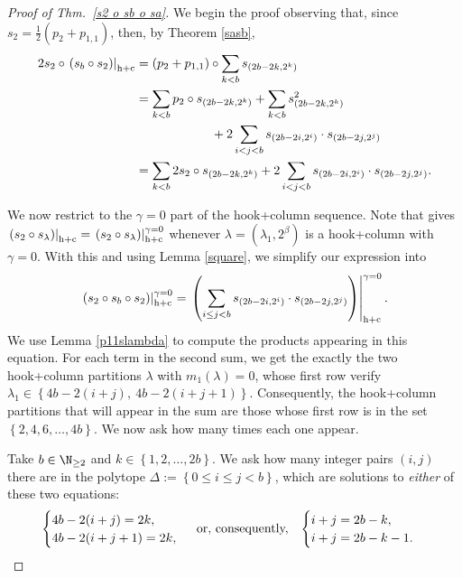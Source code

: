 \documentclass[twoside]{article}
\renewcommand{\hc}[1]{\left.\left(#1\right)\right|_{\textnormal{h+c}}}
\renewcommand{\hcZ}[1]{\left.\left(#1\right)\right|_{\textnormal{h+c}}^{\gamma=0}}
\begin{document}
\begin{proof}[Proof of Thm.~\ref{s2 o sb o sa}]
We begin the proof observing that, since $s_2 = \frac{1}{2}(p_{2}+ p_{1,1})$, then, by Theorem \ref{sasb},
\begin{align}\label{eq:suma gorda}
    2s_2 \circ \hc{s_b\circ s_2}
    &= (p_2 + p_{1,1})\circ \sum_{k<b} s_{(2b-2k, 2^k)}\nonumber\\
    &= \sum_{k<b} p_2\circ s_{(2b-2k, 2^k)} + \sum_{k<b} s_{(2b-2k, 2^k)}^2 \nonumber\\
    &\qquad\qquad\qquad 
    + 2 \sum_{i<j<b} s_{(2b-2i, 2^i)}\cdot s_{(2b-2j, 2^j)}\nonumber\\
    &= \sum_{k<b} 2s_2\circ s_{(2b-2k, 2^k)} + 2 \sum_{i<j<b} s_{(2b-2i, 2^i)}\cdot s_{(2b-2j, 2^j)}.
\end{align}

We now restrict to the $\gamma=0$ part of the hook+column sequence.
Note that \cite[Thm.~4.8 (3)]{langley} gives $\hc{s_2\circ s_\lambda} = \hcZ{s_2\circ s_\lambda}$ whenever $\lambda = (\lambda_1, 2^\beta)$ is a hook+column with $\gamma=0$. With this and using Lemma \ref{square}, we simplify our expression into
\[
\hcZ{s_2\circ s_b \circ s_2} = \hcZ{\sum_{i\le j<b} s_{(2b-2i, 2^i)}\cdot s_{(2b-2j, 2^j)}}.
\]
We use Lemma \ref{p11slambda} to compute the products appearing in this equation. For each term in the second sum, we get the exactly the two hook+column partitions $\lambda$ with $m_1(\lambda)=0$,  whose first row verify
\begin{math}
\lambda_1 \in \left\{4b -2(i+j),\ 4b - 2(i+j+1)\right\}.
\end{math}
Consequently, the hook+column partitions that will appear in the sum are those whose first row is in the set $\left\{2, 4, 6, \ldots, 4b\right\}$. We now ask how many times  each one appear.

Take $b\in\N_{\ge2}$ and $k\in\left\{1,2,\ldots,2b\right\}$. We ask how many integer pairs $(i,j)$  there are in the polytope $\Delta := \left\{0\le i\le j<b\right\}$, which are solutions to \textit{either} of these two equations:
\begin{equation}\label{eq:sistema}
    \begin{cases}
4b-2(i+j) = 2k, \\
4b-2(i+j+1) = 2k,
\end{cases} \textnormal{ or, consequently, } \, \, \,
\begin{cases}
i+j=2b-k,\\i+j=2b-k-1.
\end{cases}
\end{equation}


\end{proof}
\end{document}
